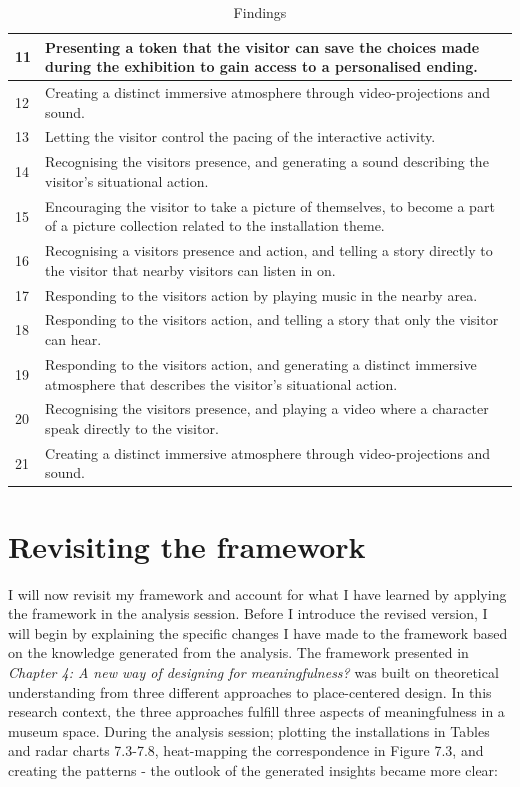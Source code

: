 \begin{table}[H]
\begin{tabular}{| p{0.75cm} | p{11cm}| }
\hline
11 & Presenting a token that the visitor can save the choices made during the exhibition to gain access to a personalised ending.\\
\hline
12 &  Creating a distinct immersive atmosphere through video-projections and sound.\\
\hline
13 & Letting the visitor control the pacing of the interactive activity.\\
\hline
14 & Recognising the visitors presence, and generating a sound describing the visitor's situational action.\\
\hline
15 & Encouraging the visitor to take a picture of themselves, to become a part of a picture collection related to the installation theme.\\
\hline
16 & Recognising a visitors presence and action, and telling a story directly to the visitor that nearby visitors can listen in on.\\
\hline
17 & Responding to the visitors action by playing music in the nearby area.\\
\hline
18 & Responding to the visitors action, and telling a story that only the visitor can hear.\\
\hline
19 & Responding to the visitors action, and generating a distinct immersive atmosphere that describes the visitor's situational action.\\
\hline
20 & Recognising the visitors presence, and playing a video where a character speak directly to the visitor.\\
\hline
21 & Creating a distinct immersive atmosphere through video-projections and sound.\\
\hline
\end{tabular}
\caption{Findings}
\end{table}

\section{Revisiting the framework}
I will now revisit my framework and account for what I have learned by applying the framework in the analysis session. Before I introduce the revised version, I will begin by explaining the specific changes I have made to the framework based on the knowledge generated from the analysis. The framework presented in \textit{Chapter 4: A new way of designing for meaningfulness?} was built on theoretical understanding from three different approaches to place-centered design. In this research context, the three approaches fulfill three aspects of meaningfulness in a museum space. During the analysis session; plotting the installations in Tables and radar charts 7.3-7.8, heat-mapping the correspondence in Figure 7.3, and creating the patterns - the outlook of the generated insights became more clear:

